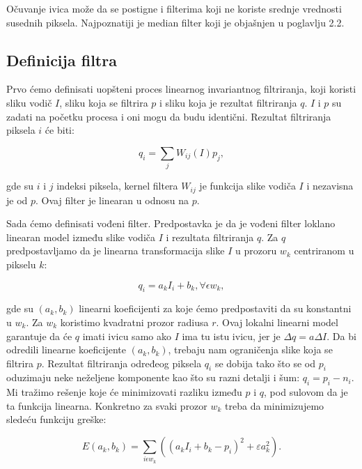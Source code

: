 \documentclass[a4paper,12pt,titlepage]{article}
\begin{document}
Očuvanje ivica može da se postigne i filterima koji ne koriste srednje vrednosti susednih piksela. Najpoznatiji je median filter koji je objašnjen u poglavlju 2.2.           

\subsection{Definicija filtra}%

Prvo ćemo definisati uopšteni proces linearnog invariantnog filtriranja, koji koristi sliku vodič $I$, sliku koja se filtrira $p$ i sliku koja je rezultat filtriranja $q$. $I$ i $p$ su zadati na početku procesa i oni mogu da budu identični. Rezultat filtriranja piksela $i$ će biti: 

\begin{equation}\label{eq:gf1}
	q_i = \sum_{j} W_{ij}(I)p_j,
\end{equation}

gde su $i$ i $j$ indeksi piksela, kernel filtera $W_{ij}$ je funkcija slike vodiča $I$ i nezavisna je od $p$. Ovaj filter je linearan u odnosu na $p$. 

Sada ćemo definisati vođeni filter. Predpostavka je da je vođeni filter loklano linearan model između slike vodiča $I$ i rezultata filtriranja $q$. Za $q$ predpostavljamo da je linearna transformacija slike $I$ u prozoru $w_k$ centriranom u pikselu $k$:

\begin{equation}\label{eq:gf2}
	q_i = a_kI_i + b_k, \forall \epsilon w_k,
\end{equation}

gde su $(a_k, b_k)$ linearni koeficijenti za koje ćemo predpostaviti da su konstantni u $w_k$. Za $w_k$ koristimo kvadratni prozor radiusa $r$. Ovaj lokalni linearni model garantuje da će $q$ imati ivicu samo ako $I$ ima tu istu ivicu, jer je $\Delta q = a\Delta I$. Da bi odredili linearne koeficijente $(a_k, b_k)$, trebaju nam ograničenja slike koja se filtrira $p$. Rezultat filtriranja određeog piksela $q_i$ se dobija tako što se od $p_i$ oduzimaju neke neželjene komponente kao što su razni detalji i šum: $q_i = p_i - n_i$. Mi tražimo rešenje koje će minimizovati razliku između $p$ i $q$, pod sulovom da je ta funkcija linearna. Konkretno za svaki prozor $w_k$ treba da minimizujemo sledeću funkciju greške:

\begin{equation}\label{eq:gf3}
	E(a_k, b_k) = \sum_{i \epsilon w_k} ((a_kI_i + b_k - p_i)^2 + \varepsilon a_k^2).
\end{equation}
\end{document}
